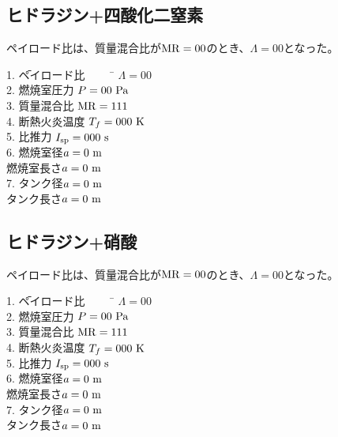 \documentclass{jsarticle}
\begin{document}
\subsection{ヒドラジン+四酸化二窒素}
ペイロード比は、質量混合比が$\rm{MR}=00$のとき、$\Lambda = 00$となった。
\begin{tabbing} 
1. \=ペイロード比 ~~~~ \= $\Lambda = 00$\\

2. \>燃焼室圧力 \> $P = 00 ~\rm{Pa}$\\

3. \>質量混合比 \>$\rm{MR}=111$\\

4. \>断熱火炎温度 \>$T_f = 000 ~ \rm{K}$\\

5. \>比推力 \>$I_{\rm{sp}}= 000 ~\rm{s}$\\

6. \>燃焼室径\>$a = 0 ~ \rm{m}$\\

\>燃焼室長さ\>$a = 0 ~ \rm{m}$\\

7. \>タンク径\>$a = 0 ~ \rm{m}$\\

\>タンク長さ\>$a = 0 ~ \rm{m}$\\
\end{tabbing} 


\subsection{ヒドラジン+硝酸}
ペイロード比は、質量混合比が$\rm{MR}=00$のとき、$\Lambda = 00$となった。
\begin{tabbing} 
1. \=ペイロード比 ~~~~ \= $\Lambda = 00$\\

2. \>燃焼室圧力 \> $P = 00 ~\rm{Pa}$\\

3. \>質量混合比 \>$\rm{MR}=111$\\

4. \>断熱火炎温度 \>$T_f = 000 ~ \rm{K}$\\

5. \>比推力 \>$I_{\rm{sp}}= 000 ~\rm{s}$\\

6. \>燃焼室径\>$a = 0 ~ \rm{m}$\\

\>燃焼室長さ\>$a = 0 ~ \rm{m}$\\

7. \>タンク径\>$a = 0 ~ \rm{m}$\\

\>タンク長さ\>$a = 0 ~ \rm{m}$\\
\end{tabbing} 
\end{document}
